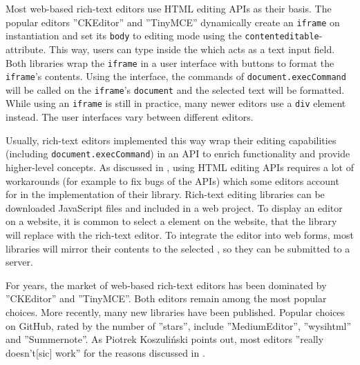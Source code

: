 Most web-based rich-text editors use HTML editing APIs as their basis. The popular editors ''CKEditor'' and ''TinyMCE'' dynamically create an \texttt{iframe} on instantiation and set its \texttt{body} to editing mode using the \texttt{contenteditable}-attribute. This way, users can type inside the  which acts as a text input field. Both libraries wrap the \texttt{iframe} in a user interface with buttons to format the \texttt{iframe}'s contents. Using the interface, the commands of \texttt{document.execCommand} will be called on the \texttt{iframe}'s \texttt{document} and the selected text will be formatted. While using an \texttt{iframe} is still in practice, many newer editors use a  \texttt{div} element instead. The user interfaces vary between different editors. %

Usually, rich-text editors implemented this way wrap their editing capabilities (including \texttt{document.execCommand}) in an API to enrich functionality and provide higher-level concepts. As discussed in , using HTML editing APIs requires a lot of workarounds (for example to fix bugs of the APIs) which some editors account for in the implementation of their library. Rich-text editing libraries can be downloaded JavaScript files and included in a web project. To display an editor on a website, it is common to select a  element on the website, that the library will replace with the rich-text editor. To integrate the editor into web forms, most libraries will mirror their contents to the selected , so they can be submitted to a server.

For years, the market of web-based rich-text editors has been dominated by ''CKEditor'' and ''TinyMCE''. Both editors remain among the most popular choices. More recently, many new libraries have been published. Popular choices on GitHub, rated by the number of ''stars'', include ''MediumEditor'', ''wysihtml'' and ''Summernote''. As Piotrek Koszuli\'{n}ski points out, most editors ''really doesn't[sic] work'' \cite{bj} for the reasons discussed in .

